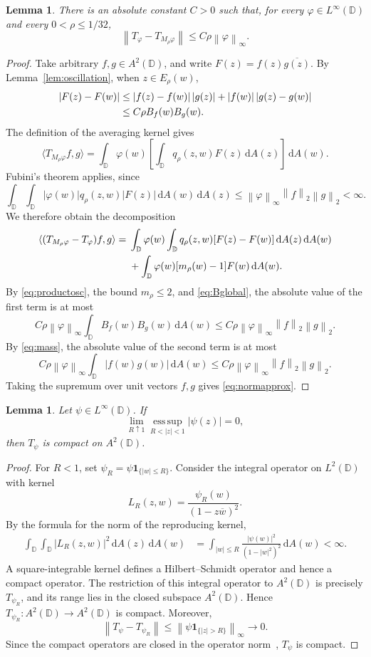 \documentclass[12pt,a4paper]{article}
\newtheorem{lemma}[theorem]{Lemma}
\theoremstyle{remark}
\newcommand{\D}{\mathbb D}
\newcommand{\dA}{\,\mathrm dA}
\newcommand{\A}{A^2(\D)}
\newcommand{\norm}[1]{\left\lVert#1\right\rVert}
\begin{document}
\begin{lemma}\label{lem:approx}
There is an absolute constant $C>0$ such that, for every $\varphi\in L^\infty(\D)$ and
every $0<\rho\le1/32$,
\begin{equation}\label{eq:normapprox}
\norm{T_\varphi-T_{M_\rho\varphi}}\le C\rho\norm\varphi_\infty.
\end{equation}
\end{lemma}
\begin{proof}
Take arbitrary $f,g\in\A$, and write $F(z)=f(z)\overline{g(z)}$.
By Lemma~\ref{lem:oscillation}, when $z\in E_\rho(w)$,
\begin{align}
|F(z)-F(w)|
&\le |f(z)-f(w)|\,|g(z)|+|f(w)|\,|g(z)-g(w)|\notag\\
&\le C\rho B_f(w)B_g(w).\label{eq:productosc}
\end{align}
The definition of the averaging kernel gives
\[
\langle T_{M_\rho\varphi}f,g\rangle
=\int_\D\varphi(w)\left[\int_\D q_\rho(z,w)F(z)\dA(z)\right]\dA(w).
\]
Fubini's theorem  applies, since
\[
\int_\D\int_\D |\varphi(w)|q_\rho(z,w)|F(z)|\dA(w)\dA(z)
\le\norm\varphi_\infty\norm f_2\norm g_2<\infty .
\]
We therefore obtain the decomposition
\begin{align}
\langle(T_{M_\rho\varphi}-T_\varphi)f,g\rangle
={}&\int_\D\varphi(w)\int_\D q_\rho(z,w)
 [F(z)-F(w)]\dA(z)\dA(w)\notag\\
&+\int_\D\varphi(w)[m_\rho(w)-1]F(w)\dA(w).
\label{eq:spliterror}
\end{align}
By \eqref{eq:productosc}, the bound $m_\rho\le2$, and \eqref{eq:Bglobal}, the absolute value of the first term is at most
\[
C\rho\norm\varphi_\infty\int_\D B_f(w)B_g(w)\dA(w)
\le C\rho\norm\varphi_\infty\norm f_2\norm g_2.
\]
By \eqref{eq:mass}, the absolute value of the second term is at most
\[
C\rho\norm\varphi_\infty\int_\D|f(w)g(w)|\dA(w)
\le C\rho\norm\varphi_\infty\norm f_2\norm g_2.
\]
Taking the supremum over unit vectors $f,g$ gives \eqref{eq:normapprox}.
\end{proof}
\begin{lemma}\label{lem:vanishing}
Let $\psi\in L^\infty(\mathbb D)$. If
\[
\lim_{R\uparrow1}
\operatorname*{ess\,sup}_{R<|z|<1}|\psi(z)|=0,
\]
then $T_\psi$ is compact on $A^2(\mathbb D)$.
\end{lemma}
\begin{proof}
For $R<1$, set $\psi_R=\psi\mathbf1_{\{|w|\le R\}}$.
Consider the integral operator on $L^2(\D)$ with kernel
\[
L_R(z,w)=\frac{\psi_R(w)}{(1-z\overline w)^2}.
\]
By the formula for the norm of the reproducing kernel,
\begin{align*}
\int_\D\int_\D |L_R(z,w)|^2\dA(z)\dA(w)
&=\int_{|w|\le R}\frac{|\psi(w)|^2}{(1-|w|^2)^2}\dA(w)<\infty.
\end{align*}
A square-integrable kernel defines a Hilbert--Schmidt operator and hence a compact operator. The restriction of this integral operator to $\A$ is precisely $T_{\psi_R}$,
and its range lies in the closed subspace $\A$. Hence $T_{\psi_R}:\A\to\A$ is compact.
Moreover,
\[
\norm{T_\psi-T_{\psi_R}}
\le\norm{\psi\mathbf1_{\{|z|>R\}}}_\infty\longrightarrow0.
\]
Since the compact operators are closed in the operator norm~\cite{Conway1990}, $T_\psi$ is compact.
\end{proof}
\end{document}

